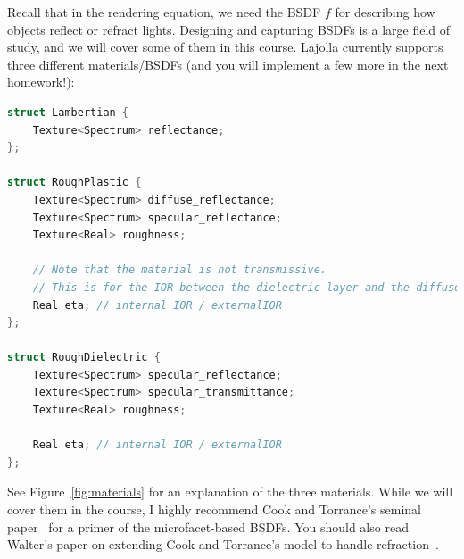 Recall that in the rendering equation, we need the BSDF $f$ for describing how objects reflect or refract lights. Designing and capturing BSDFs is a large field of study, and we will cover some of them in this course. Lajolla currently supports three different materials/BSDFs (and you will implement a few more in the next homework!):
\begin{lstlisting}[language=c++]
struct Lambertian {
    Texture<Spectrum> reflectance;
};

struct RoughPlastic {
    Texture<Spectrum> diffuse_reflectance;
    Texture<Spectrum> specular_reflectance;
    Texture<Real> roughness;

    // Note that the material is not transmissive.
    // This is for the IOR between the dielectric layer and the diffuse layer.
    Real eta; // internal IOR / externalIOR
};

struct RoughDielectric {
    Texture<Spectrum> specular_reflectance;
    Texture<Spectrum> specular_transmittance;
    Texture<Real> roughness;

    Real eta; // internal IOR / externalIOR
};
\end{lstlisting}

See Figure~\ref{fig:materials} for an explanation of the three materials. While we will cover them in the course, I highly recommend Cook and Torrance's seminal paper~\cite{Cook:1982:RMC} for a primer of the microfacet-based BSDFs. You should also read Walter's paper on extending Cook and Torrance's model to handle refraction~\cite{Walter:2007:MMR}.

